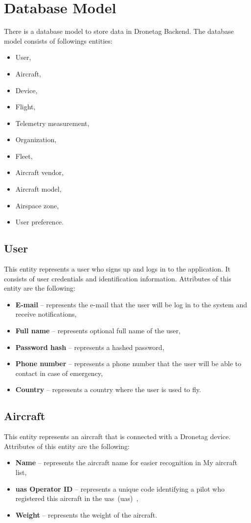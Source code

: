 \section{Database Model}\label{sec:database-model}
There is a database model to store data in Dronetag Backend.
The database model consists of followings entities:
\begin{itemize}
    \item User,
    \item Aircraft,
    \item Device,
    \item Flight,
    \item Telemetry measurement,
    \item Organization,
    \item Fleet,
    \item Aircraft vendor,
    \item Aircraft model,
    \item Airspace zone,
    \item User preference.
\end{itemize}

\subsection{User}\label{subsec:user}
This entity represents a user who signs up and logs in to the application.
It consists of user credentials and identification information.
Attributes of this entity are the following:
\begin{itemize}
    \item \textbf{E-mail} -- represents the e-mail that the user will be log in to the system and receive notifications,
    \item \textbf{Full name} -- represents optional full name of the user,
    \item \textbf{Password hash} -- represents a hashed password,
    \item \textbf{Phone number} -- represents a phone number that the user will be able to contact in case of emergency,
    \item \textbf{Country} -- represents a country where the user is used to fly.
\end{itemize}

\subsection{Aircraft}\label{subsec:aircraft}
This entity represents an aircraft that is connected with a Dronetag device.
Attributes of this entity are the following:
\begin{itemize}
    \item \textbf{Name} -- represents the aircraft name for easier recognition in My aircraft list,
    \item \textbf{\acrshort{uas} Operator ID} -- represents a unique code identifying a pilot who registered this aircraft in the \acrshort{uas}~(\acrlong{uas})~\cite{uas},
    \item \textbf{Weight} -- represents the weight of the aircraft.
\end{itemize}

